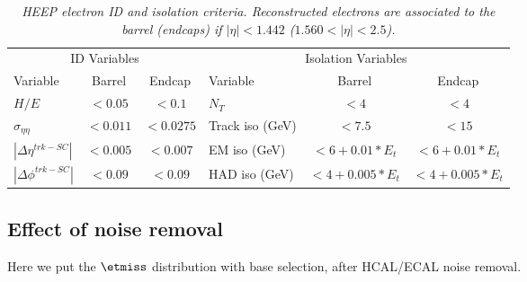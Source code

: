 \begin{table}[htbp]
 \label{tab:HEEPselection}
 \begin{center}
   \begin{tabular}{|lcc|lcc|} \hline
     \multicolumn{3}{|c|}{ID Variables} & \multicolumn{3}{|c|}{Isolation Variables} \\
     Variable & Barrel & Endcap & Variable & Barrel & Endcap  \\ \hline
     $H/E$  & $<0.05$ & $<0.1$ & $N_T$  & $<4$ & $<4$ \\ \hline
     $\sigma_{\eta\eta}$  & $<0.011$ & $<0.0275$ & Track iso (GeV) & $<7.5$ & $<15$ \\ \hline
     $|\Delta\eta^{trk-SC}|$ & $<0.005$ & $<0.007$ & EM iso (GeV) & $<6+0.01*E_{t}$ & $<6+0.01*E_{t}$ \\ \hline
     $|\Delta\phi^{trk-SC}|$ & $<0.09$ & $<0.09$ & HAD iso (GeV) & $<4+0.005*E_{t}$ & $<4+0.005*E_{t}$ \\ \hline
   \end{tabular}
 \caption{\small \sl HEEP electron ID and isolation criteria.
   Reconstructed electrons are associated to the
   barrel (endcaps) if $|\eta|<1.442$ ($1.560<|\eta|<2.5$).}
 \end{center}
\end{table}


\subsection{Effect of noise removal}
Here we put the $\etmiss$ distribution with base selection, after HCAL/ECAL
noise removal.

\clearpage
